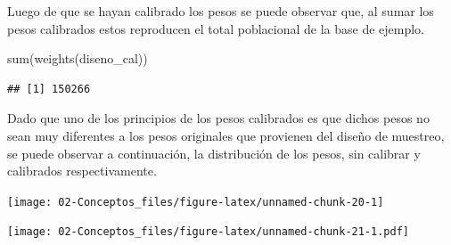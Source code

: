 \documentclass[
  12pt,
]{book}
\newenvironment{Shaded}{\begin{snugshade}}{\end{snugshade}}
\newcommand{\AttributeTok}[1]{\textcolor[rgb]{0.77,0.63,0.00}{#1}}
\newcommand{\DecValTok}[1]{\textcolor[rgb]{0.00,0.00,0.81}{#1}}
\newcommand{\FunctionTok}[1]{\textcolor[rgb]{0.00,0.00,0.00}{#1}}
\newcommand{\NormalTok}[1]{#1}
\newcommand{\OtherTok}[1]{\textcolor[rgb]{0.56,0.35,0.01}{#1}}
\newcommand{\SpecialCharTok}[1]{\textcolor[rgb]{0.00,0.00,0.00}{#1}}
\begin{document}
Luego de que se hayan calibrado los pesos se puede observar que, al sumar los pesos calibrados estos reproducen el total poblacional de la base de ejemplo.

\begin{Shaded}
\begin{Highlighting}[]
\FunctionTok{sum}\NormalTok{(}\FunctionTok{weights}\NormalTok{(diseno\_cal))}
\end{Highlighting}
\end{Shaded}

\begin{verbatim}
## [1] 150266
\end{verbatim}

\begin{Shaded}
\end{Shaded}

Dado que uno de los principios de los pesos calibrados es que dichos pesos no sean muy diferentes a los pesos originales que provienen del diseño de muestreo, se puede observar a continuación, la distribución de los pesos, sin calibrar y calibrados respectivamente.

\begin{Shaded}
\end{Shaded}

\begin{center}\texttt{[image: 02-Conceptos\_files/figure-latex/unnamed-chunk-20-1]} \end{center}

\begin{Shaded}
\end{Shaded}

\texttt{[image: 02-Conceptos\_files/figure-latex/unnamed-chunk-21-1.pdf]}
\end{document}
